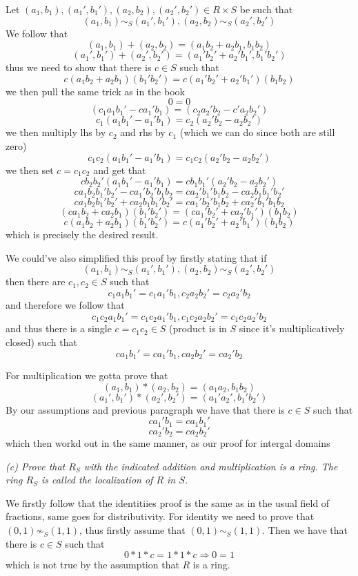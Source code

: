 \documentclass[11pt,oneside,titlepage]{book}
\DeclareMathOperator \ra {\Rightarrow}
\begin{document}
Let $(a_1, b_1), (a_1', b_1'), (a_2, b_2), (a_2', b_2') \in R \times
S$ be such that
$$(a_1, b_1) \sim_S (a_1', b_1'), (a_2, b_2) \sim_S (a_2', b_2')$$
We follow that
$$(a_1, b_1) + (a_2, b_2) = (a_1 b_2 + a_2 b_1, b_1 b_2)$$
$$(a_1', b_1') + (a_2', b_2') = (a_1' b_2' + a_2' b_1', b_1' b_2')$$
thus we need to show that there is $c \in S$ such that 
$$c (a_1 b_2 + a_2 b_1) (b_1' b_2') = c (a_1' b_2' + a_2' b_1') (b_1 b_2)$$
we then pull the same trick as in the book
$$0 = 0$$
$$(c_1 a_1b_1' - c a_1' b_1 ) = (c_2 a_2' b_2 - c' a_2  b_2')$$
$$c_1 (a_1b_1' - a_1' b_1 ) = c_2 (a_2' b_2 -  a_2  b_2')$$
we then multiply lhs by $c_2$ and rhs by $c_1$ (which we can do since both are still zero)
$$c_1 c_2 (a_1b_1' - a_1' b_1 ) = c_1 c_2 (a_2' b_2 -  a_2  b_2')$$
we then set $c = c_1 c_2$ and get that 
$$c b_2 b_2' (a_1b_1' - a_1' b_1 ) = c b_1 b_1'(a_2' b_2 - a_2  b_2')$$
$$c a_1 b_2 b_1' b_2' - c a_1' b_2' b_1 b_2 = c a_2' b_1' b_1 b_2 - c a_2 b_1 b_1' b_2'$$
$$c a_1 b_2 b_1' b_2' + c a_2 b_1 b_1' b_2' = c a_1' b_2' b_1 b_2 + c a_2' b_1' b_1 b_2$$
$$(c a_1 b_2 + c a_2 b_1) (b_1' b_2') = (c a_1' b_2' + c a_2' b_1') (b_1 b_2)$$
$$c (a_1 b_2 + a_2 b_1) (b_1' b_2') = c (a_1' b_2' + a_2' b_1') (b_1 b_2)$$
which is precisely the desired result.

We could've also simplified this proof by firstly stating that if
$$(a_1, b_1) \sim_S (a_1', b_1'), (a_2, b_2) \sim_S (a_2', b_2')$$
then there are $c_1, c_2 \in S$ such that
$$c_1 a_1 b_1' = c_1 a_1' b_1, c_2 a_2 b_2' = c_2 a_2' b_2$$
and therefore we follow that
$$c_1c_2  a_1 b_1' = c_1c_2 a_1' b_1, c_1 c_2 a_2 b_2' = c_1 c_2 a_2' b_2$$
and thus there is a single $c = c_1 c_2 \in S$ (product is in $S$
since it's multiplicatively closed) such that
$$c a_1 b_1' = ca_1' b_1, c a_2 b_2' = c a_2' b_2$$

For multiplication we gotta prove that
$$(a_1, b_1) * (a_2, b_2) = (a_1 a_2, b_1 b_2)$$
$$(a_1', b_1') * (a_2', b_2') = (a_1' a_2', b_1' b_2')$$
By our assumptions and previous paragraph we have that there is $c \in
S$ such that
$$ca_1' b_1 = ca_1 b_1'$$
$$ca_2' b_2 = ca_2 b_2'$$
which then workd out in the same manner, as our proof for intergal
domains

\textit{(c) Prove that $R_S$ with the indicated addition and
multiplication is a ring. The ring $R_S$ is called the localization of
$R$ in $S$.}

We firstly follow that the identitiies proof is the same as in the
usual field of fractions, same goes for distributivity. For identity
we need to prove that $(0, 1) \not \sim_S (1, 1)$, thus firstly assume
that $(0, 1) \sim_S (1, 1)$.  Then we have that there is $c \in S$
such that
$$0 * 1 * c = 1 * 1 * c \ra 0 = 1$$
which is not true by the assumption that $R$ is a ring.
\end{document}
